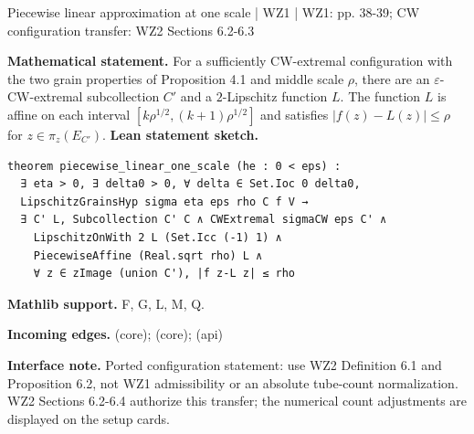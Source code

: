 \documentclass[10pt,a4paper]{article}
\newcommand{\nodecard}[1]{\hyperlink{node-#1}{\texttt{\detokenize{#1}}}}
\begin{document}
\begin{minipage}{\linewidth}
\hypertarget{node-L5_4}{}
\begin{tcolorbox}[colback=white,colframe=regularityfg,colbacktitle=regularitybg,coltitle=ink,boxrule=0.45pt,arc=1.6mm,left=3mm,right=3mm,top=2mm,bottom=2mm,title={\sffamily\bfseries WZ1 Lemma 5.4 / CW \hfill \texttt{L5\_4}}]
{\sffamily\small\color{muted}Piecewise linear approximation at one scale | WZ1 | WZ1: pp. 38-39; CW configuration transfer: WZ2 Sections 6.2-6.3}\par
\textbf{Mathematical statement.} For a sufficiently CW-extremal configuration with the two grain properties of Proposition 4.1 and middle scale $\rho$, there are an $\varepsilon$-CW-extremal subcollection $C'$ and a $2$-Lipschitz function $L$.
The function $L$ is affine on each interval $[k\rho^{1/2},(k+1)\rho^{1/2}]$ and satisfies
$|f(z)-L(z)|\le\rho$ for $z\in\pi_z(E_{C'})$.
\smallskip\textbf{Lean statement sketch.}
\begin{Verbatim}[fontsize=\small,breaklines=true,breakanywhere=true,tabsize=2]
theorem piecewise_linear_one_scale (he : 0 < eps) :
  ∃ eta > 0, ∃ delta0 > 0, ∀ delta ∈ Set.Ioc 0 delta0,
  LipschitzGrainsHyp sigma eta eps rho C f V →
  ∃ C' L, Subcollection C' C ∧ CWExtremal sigmaCW eps C' ∧
    LipschitzOnWith 2 L (Set.Icc (-1) 1) ∧
    PiecewiseAffine (Real.sqrt rho) L ∧
    ∀ z ∈ zImage (union C'), |f z-L z| ≤ rho
\end{Verbatim}
{\footnotesize\textbf{Mathlib support.} F, G, L, M, Q.\par
\textbf{Incoming edges.} \nodecard{L5_3} (core); \nodecard{W2P6_2} (core); \nodecard{Icover} (api)\par}
{\footnotesize\textbf{Interface note.}  Ported configuration statement: use WZ2 Definition 6.1 and Proposition 6.2, not WZ1 admissibility or an absolute tube-count normalization. WZ2 Sections 6.2-6.4 authorize this transfer; the numerical count adjustments are displayed on the setup cards.}
\end{tcolorbox}\end{minipage}\par\medskip
\end{document}
